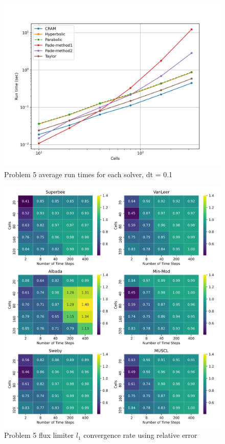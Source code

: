 \clearpage

\begin{figure}[p]
    \centering
    \includegraphics[width=6in]{images/chapter-5/problem5Runtimes.png}
    \caption{Problem 5 average run times for each solver, dt = 0.1}
    \label{fig:problem5_runtimes}
\end{figure}

\clearpage

\begin{figure}[p]
    \centering
    \includegraphics[width=6in]{images/chapter-5/problem5FluxLimiterConvergenceRate.png}
    \caption{Problem 5 flux limiter $l_{1}$ convergence rate using relative error}
    \label{fig:problem5_fluxlimiter_convergence_rate}
\end{figure}

